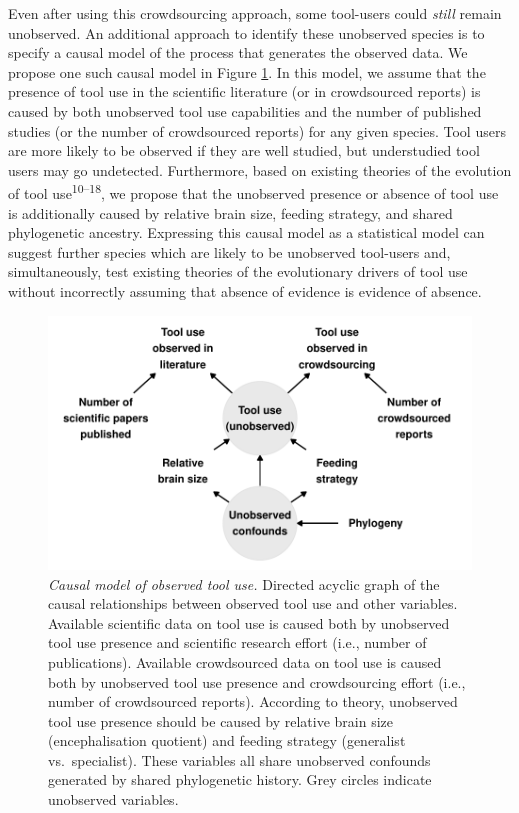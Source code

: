 \documentclass[
  man,floatsintext]{apa6}
\begin{document}
Even after using this crowdsourcing approach, some tool-users could \emph{still} remain unobserved. An additional approach to identify these unobserved species is to specify a causal model of the process that generates the observed data. We propose one such causal model in Figure \ref{fig:plotDAG}. In this model, we assume that the presence of tool use in the scientific literature (or in crowdsourced reports) is caused by both unobserved tool use capabilities and the number of published studies (or the number of crowdsourced reports) for any given species. Tool users are more likely to be observed if they are well studied, but understudied tool users may go undetected. Furthermore, based on existing theories of the evolution of tool use\textsuperscript{10--18}, we propose that the unobserved presence or absence of tool use is additionally caused by relative brain size, feeding strategy, and shared phylogenetic ancestry. Expressing this causal model as a statistical model can suggest further species which are likely to be unobserved tool-users and, simultaneously, test existing theories of the evolutionary drivers of tool use without incorrectly assuming that absence of evidence is evidence of absence.



\begin{figure}
\centering
\includegraphics{manuscript_files/figure-latex/plotDAG-1.pdf}
\caption{\label{fig:plotDAG}\emph{Causal model of observed tool use.} Directed acyclic graph of the causal relationships between observed tool use and other variables. Available scientific data on tool use is caused both by unobserved tool use presence and scientific research effort (i.e., number of publications). Available crowdsourced data on tool use is caused both by unobserved tool use presence and crowdsourcing effort (i.e., number of crowdsourced reports). According to theory, unobserved tool use presence should be caused by relative brain size (encephalisation quotient) and feeding strategy (generalist vs.~specialist). These variables all share unobserved confounds generated by shared phylogenetic history. Grey circles indicate unobserved variables.}
\end{figure}
\end{document}

